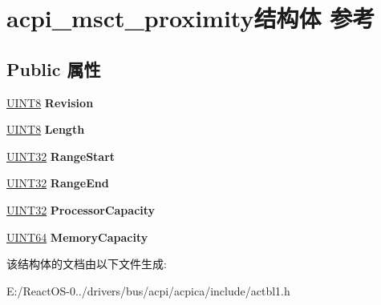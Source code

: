 \hypertarget{structacpi__msct__proximity}{}\section{acpi\+\_\+msct\+\_\+proximity结构体 参考}
\label{structacpi__msct__proximity}
\subsection*{Public 属性}
\begin{DoxyCompactItemize}
\item 
\mbox{\label{structacpi__msct__proximity_ad98d7837295c11c2f35f62943bef70d9}} 
\hyperlink{_processor_bind_8h_ab27e9918b538ce9d8ca692479b375b6a}{U\+I\+N\+T8} {\bfseries Revision}
\item 
\mbox{\label{structacpi__msct__proximity_a8e486dda9b200b13830117888ad78c57}} 
\hyperlink{_processor_bind_8h_ab27e9918b538ce9d8ca692479b375b6a}{U\+I\+N\+T8} {\bfseries Length}
\item 
\mbox{\label{structacpi__msct__proximity_aa9b0d5bb2cd316b3d261cacd9601a42c}} 
\hyperlink{_processor_bind_8h_ae1e6edbbc26d6fbc71a90190d0266018}{U\+I\+N\+T32} {\bfseries Range\+Start}
\item 
\mbox{\label{structacpi__msct__proximity_abad63f5b259aa99160ab4e4a19610fbf}} 
\hyperlink{_processor_bind_8h_ae1e6edbbc26d6fbc71a90190d0266018}{U\+I\+N\+T32} {\bfseries Range\+End}
\item 
\mbox{\label{structacpi__msct__proximity_a446d701c3c92bda57cb29d77b5502435}} 
\hyperlink{_processor_bind_8h_ae1e6edbbc26d6fbc71a90190d0266018}{U\+I\+N\+T32} {\bfseries Processor\+Capacity}
\item 
\mbox{\label{structacpi__msct__proximity_afd53d332f702ac64f71594d78acf6c1d}} 
\hyperlink{_processor_bind_8h_a57be03562867144161c1bfee95ca8f7c}{U\+I\+N\+T64} {\bfseries Memory\+Capacity}
\end{DoxyCompactItemize}


该结构体的文档由以下文件生成\+:\begin{DoxyCompactItemize}
\item 
E\+:/\+React\+O\+S-\/0../drivers/bus/acpi/acpica/include/actbl1.\+h\end{DoxyCompactItemize}
